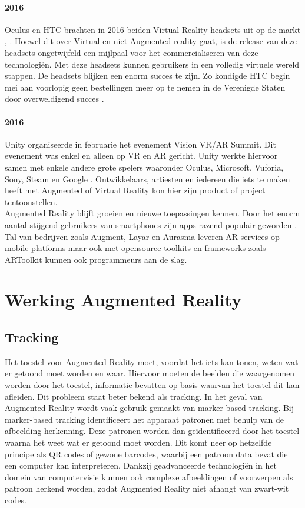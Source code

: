 \documentclass[pdftex,a4paper,12pt,twoside]{report}
\begin{document}
\paragraph{2016} Oculus en HTC brachten in 2016 beiden Virtual Reality headsets uit op de markt \citep{oculus}, \citep{htcvive}. Hoewel dit over Virtual en niet Augmented reality gaat, is de release van deze headsets ongetwijfeld een mijlpaal voor het commercialiseren van deze technologi\"en. Met deze headsets kunnen gebruikers in een volledig virtuele wereld stappen. De headsets blijken een enorm succes te zijn. Zo kondigde HTC begin mei aan voorlopig geen bestellingen meer op te nemen in de Verenigde Staten door overweldigend succes \citep{htcsucces}. \\

\paragraph{2016} Unity organiseerde in februarie het evenement Vision VR/AR Summit. Dit evenement was enkel en alleen op VR en AR gericht. Unity werkte hiervoor samen met enkele andere grote spelers waaronder Oculus, Microsoft, Vuforia, Sony, Steam en Google \citep{summit}. Ontwikkelaars, artiesten en iedereen die iets te maken heeft met Augmented of Virtual Reality kon hier zijn product of project tentoonstellen. \\

 Augmented Reality blijft groeien en nieuwe toepassingen kennen. Door het enorm aantal stijgend gebruikers van smartphones zijn apps razend populair geworden \citep{smartpop}. Tal van bedrijven zoals Augment, Layar en Aurasma leveren AR services op mobile platforms maar ook met opensource toolkits en frameworks zoals ARToolkit kunnen ook programmeurs aan de slag. 


\section{Werking Augmented Reality}

  \subsection{Tracking}
	\label{sec:tracking}
	Het toestel voor Augmented Reality moet, voordat het iets kan tonen, weten wat er getoond moet worden en waar. Hiervoor moeten de beelden die waargenomen worden door het toestel, informatie bevatten op basis waarvan het toestel dit kan afleiden. Dit probleem staat beter bekend als tracking. In het geval van Augmented Reality wordt vaak gebruik gemaakt van marker-based tracking. Bij marker-based tracking identificeert het apparaat patronen met behulp van de afbeelding herkenning. Deze patronen worden dan ge\"identificeerd door het toestel waarna het weet wat er getoond moet worden. Dit komt neer op hetzelfde principe als QR codes of gewone barcodes, waarbij een patroon data bevat die een computer kan interpreteren. Dankzij geadvanceerde technologi\"en in het domein van computervisie kunnen ook complexe afbeeldingen of voorwerpen als patroon herkend worden, zodat Augmented Reality niet afhangt van zwart-wit codes. \\
	
\end{document}
